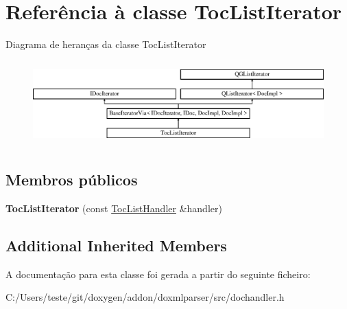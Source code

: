 \hypertarget{class_toc_list_iterator}{\section{Referência à classe Toc\-List\-Iterator}
\label{class_toc_list_iterator}
}
Diagrama de heranças da classe Toc\-List\-Iterator\begin{figure}[H]
\begin{center}
\leavevmode
\includegraphics[height=3.294118cm]{class_toc_list_iterator}
\end{center}
\end{figure}
\subsection*{Membros públicos}
\begin{DoxyCompactItemize}
\item 
\hypertarget{class_toc_list_iterator_af39938a5bd984d9627977f3513b78a09}{{\bfseries Toc\-List\-Iterator} (const \hyperlink{class_toc_list_handler}{Toc\-List\-Handler} \&handler)}\label{class_toc_list_iterator_af39938a5bd984d9627977f3513b78a09}

\end{DoxyCompactItemize}
\subsection*{Additional Inherited Members}


A documentação para esta classe foi gerada a partir do seguinte ficheiro\-:\begin{DoxyCompactItemize}
\item 
C\-:/\-Users/teste/git/doxygen/addon/doxmlparser/src/dochandler.\-h\end{DoxyCompactItemize}
